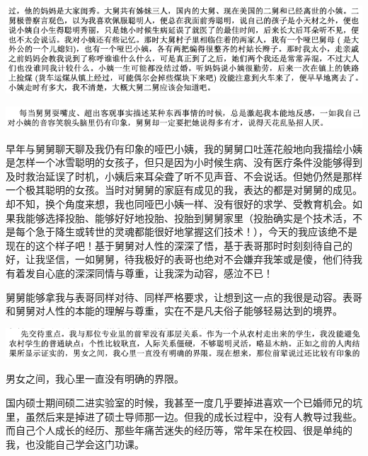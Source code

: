 \documentclass[9pt, b5paper]{article}
\begin{document}
\begin{center}
\includegraphics[width=.9\linewidth]{./pic/backups_plans_20210414_101343.png}
\end{center}

\begin{center}
\includegraphics[width=.9\linewidth]{./pic/backups_plans_20210412_114832.png}
\end{center}

早年与舅舅聊天聊及我仍有印象的哑巴小姨，我的舅舅口吐莲花般地向我描绘小姨是怎样一个冰雪聪明的女孩子，但只是因为小时候生病、没有医疗条件没能够得到及时救治延误了时机，小姨后来耳朵聋了听不见声音、不会说话。但她仍然是那样一个极其聪明的女孩。当时对舅舅的家庭有成见的我，表达的都是对舅舅的成见。却不知，换个角度来想，我也同哑巴小姨一样、没有很好的求学、受教育机会。如果我能够选择投胎、能够好好地投胎、投胎到舅舅家里（投胎确实是个技术活，不是每个急于降生或转世的灵魂都能很好地掌握这们技术！），今天的我应该绝不是现在的这个样子吧！基于舅舅对人性的深深了悟，基于表哥那时时刻刻待自己的好，让我坚信，一如舅舅，待我极好的表哥也绝对不会嫌弃我笨或是傻，他们待我有着发自心底的深深同情与尊重，让我深为动容，感泣不已！

舅舅能够拿我与表哥同样对待、同样严格要求，让想到这一点的我很是动容。表哥和舅舅对人性的本能的理解与尊重，实在不是凡夫俗子能够轻易达到的境界。

\begin{center}
\includegraphics[width=.9\linewidth]{./pic/backups_plans_20210412_104246.png}
\end{center}

男女之间，我心里一直没有明确的界限。

国内硕士期间硕二进实验室的时候，我甚至一度几乎要掉进喜欢一个已婚师兄的坑里，虽然后来是掉进了硕士导师那一边。但我的成长过程中，没有人教导过我些。而自己个人成长的经历、那些年痛苦迷失的经历等，常年呆在校园、很是单纯的我，也没能自己学会这门功课。
\end{document}

